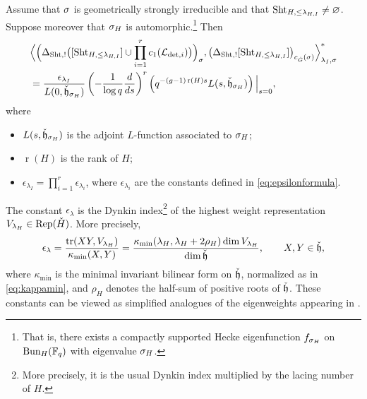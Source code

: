 \documentclass[reqno]{amsart}
\numberwithin{equation}{section}
\numberwithin{equation}{section}
\begin{document}
\begin{thm}\label{thm:main}
Assume that $\sigma$ is geometrically strongly irreducible and that
$\operatorname{Sht}_{H,\leq\lambda_{H,I}}\neq\varnothing$. Suppose moreover that
$\sigma_H$ is automorphic.\footnote{That is, there exists a compactly supported
Hecke eigenfunction $f_{\sigma_H}$ on $\operatorname{Bun}_H(\mathbb{F}_q)$ with eigenvalue $\sigma_H$.}
Then
\begin{equation}
\begin{aligned}
&
\Bigl\langle
\Bigl(
\Delta_{\operatorname{Sht},!}\bigl([\operatorname{Sht}_{H,\leq\lambda_{H,I}}]
\cup
\prod_{i=1}^r c_1(\mathcal{L}_{\det,i})\bigr)
\Bigr)_{\sigma},
\bigl(\Delta_{\operatorname{Sht},!}[\operatorname{Sht}_{H,\leq\lambda_{H,I}}]\bigr)_{c_{\check{G}}(\sigma)}
\Bigr\rangle_{\lambda_I,\sigma}^*
\\
&=
\frac{\epsilon_{\lambda_I}}{L(0,\check{\mathfrak{h}}_{\sigma_H})}
\left(
-\frac{1}{\log q}\frac{d}{ds}
\right)^r
\left(
q^{-(g-1)\operatorname{r}(H)s}
L(s,\check{\mathfrak{h}}_{\sigma_H})
\right)\Big|_{s=0},
\end{aligned}
\end{equation}
where
\begin{itemize}
    \item $L(s,\check{\mathfrak{h}}_{\sigma_H})$ is the adjoint $L$-function associated to $\sigma_H$;

    \item $\operatorname{r}(H)$ is the rank of $H$;

    \item $\epsilon_{\lambda_I}=\prod_{i=1}^r\epsilon_{\lambda_i}$, where
    $\epsilon_{\lambda_i}$ are the constants defined in \eqref{eq:epsilonformula}.
\end{itemize}
\end{thm}

\begin{remark}
The constant $\epsilon_{\lambda}$ is the Dynkin index\footnote{More precisely, it is the usual Dynkin index multiplied by the lacing number of $H$.} of the highest weight representation
$V_{\lambda_{H}}\in \operatorname{Rep}(\check{H})$. More precisely,
\begin{equation}\label{eq:epsilonformula}
    \epsilon_{\lambda}
    =
    \frac{\operatorname{tr}(XY, V_{\lambda_{H}})}{\kappa_{\min}(X,Y)}
    =
    \frac{\kappa_{\min}(\lambda_H,\lambda_H+2\rho_H)\dim V_{\lambda_{H}}}{\dim \check{\mathfrak{h}}},
    \qquad X,Y\in \check{\mathfrak{h}},
\end{equation}
where $\kappa_{\min}$ is the minimal invariant bilinear form on $\check{\mathfrak{h}}$,
normalized as in \eqref{eq:kappamin}, and $\rho_H$ denotes the half-sum of positive roots of $\check{\mathfrak{h}}$. These constants can be viewed as simplified analogues of the eigenweights appearing in
\cite{FYZvolume,wang2026arithmeticvolumeshtukaslanglands,feng2026eigenweightsarithmetichirzebruchproportionality}.
\end{remark}
\end{document}
